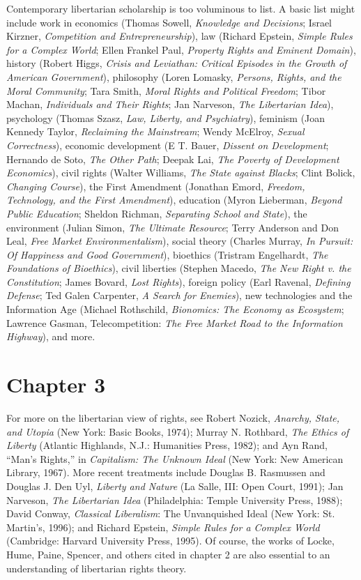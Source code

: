 Contemporary libertarian scholarship is too voluminous to list. A basic
list might include work in economics (Thomas Sowell, \textit{Knowledge and Decisions}; Israel Kirzner, \textit{Competition and Entrepreneurship}), law (Richard Epstein,
\textit{Simple Rules for a Complex World}; Ellen Frankel Paul, \textit{Property Rights and Eminent Domain}), history (Robert Higgs, \textit{Crisis and Leviathan: Critical Episodes in
the Growth of American Government}), philosophy (Loren Lomasky, \textit{Persons, Rights, and the Moral Community}; Tara Smith, \textit{Moral Rights and Political Freedom}; Tibor Machan, \textit{Individuals and Their Rights}; Jan Narveson, \textit{The Libertarian Idea}), psychology (Thomas Szasz, \textit{Law, Liberty, and Psychiatry}), feminism (Joan Kennedy Taylor, \textit{Reclaiming the Mainstream}; Wendy McElroy, \textit{Sexual
Correctness}), economic development (E T. Bauer, \textit{Dissent on Development}; Hernando de Soto, \textit{The Other Path}; Deepak Lai, \textit{The Poverty of Development Economics}), civil rights (Walter Williams, \textit{The State against Blacks}; Clint Bolick,
\textit{Changing Course}), the First Amendment (Jonathan Emord, \textit{Freedom, Technology, and the First Amendment}), education (Myron Lieberman, \textit{Beyond Public Education}; Sheldon Richman, \textit{Separating School and State}), the environment
(Julian Simon, \textit{The Ultimate Resource}; Terry Anderson and Don Leal, \textit{Free Market Environmentalism}), social theory (Charles Murray, \textit{In Pursuit: Of Happiness and Good Government}), bioethics (Tristram Engelhardt, \textit{The Foundations
of Bioethics}), civil liberties (Stephen Macedo, \textit{The New Right v. the Constitution}; James Bovard, \textit{Lost Rights}), foreign policy (Earl Ravenal, \textit{Defining Defense};
Ted Galen Carpenter, \textit{A Search for Enemies}), new technologies and the Information Age (Michael Rothschild, \textit{Bionomics: The Economy as Ecosystem};
Lawrence Gasman, Telecompetition: \textit{The Free Market Road to the Information Highway}), and more.

\section*{Chapter 3}
For more on the libertarian view of rights, see Robert Nozick, \textit{Anarchy,
State, and Utopia} (New York: Basic Books, 1974); Murray N. Rothbard, \textit{The Ethics of Liberty} (Atlantic Highlands, N.J.: Humanities Press, 1982); and Ayn Rand, ``Man's Rights,'' in \textit{Capitalism: The Unknown Ideal} (New York: New American Library, 1967). More recent treatments include Douglas B. Rasmussen and Douglas J. Den Uyl, \textit{Liberty and Nature} (La Salle, III: Open
Court, 1991); Jan Narveson, \textit{The Libertarian Idea} (Philadelphia: Temple University Press, 1988); David Conway, \textit{Classical Liberalism}: The Unvanquished
Ideal (New York: St. Martin's, 1996); and Richard Epstein, \textit{Simple Rules for a Complex World} (Cambridge: Harvard University Press, 1995). Of course, the
works of Locke, Hume, Paine, Spencer, and others cited in chapter 2 are also essential to an understanding of libertarian rights theory.

